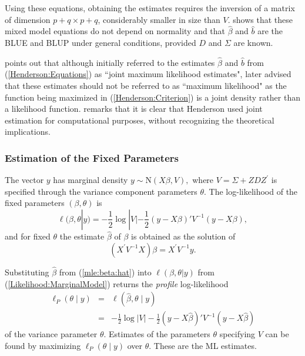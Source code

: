 \documentclass[12pt, a4paper]{report}
\theoremstyle{plain}
\theoremstyle{definition}
\theoremstyle{remark}
\begin{document}
		Using these equations, obtaining the estimates requires the inversion of a matrix
		of dimension $p+q \times p+q$, considerably smaller in size than $V$. \citet{Henderson63} shows that these mixed model equations do not depend on normality and that $\hat{\beta}$ and $\hat{b}$ are the BLUE and BLUP under general conditions, provided $D$ and $\Sigma$ are known.
		
		\cite{Robi:BLUP:1991} points out that although \cite{Henderson:1950} initially referred to the estimates $\hat{\beta}$ and $\hat{b}$ from (\ref{Henderson:Equations}) as ``joint maximum likelihood estimates", \cite{Henderson:1973} later advised that these estimates should not be referred to as ``maximum likelihood" as the function being maximized in (\ref{Henderson:Criterion}) is a joint density rather than a likelihood function. \cite{YLee} remarks that it is clear that Henderson used joint estimation for computational purposes, without recognizing the theoretical implications.
		
		
\subsubsection{Estimation of the Fixed Parameters}
			
			The vector $y$ has marginal density $y \sim \mathrm{N}(X \beta,V),$ where $V = \Sigma + ZDZ^\prime$ is specified through the variance component parameters $\theta.$ The log-likelihood of the fixed parameters $(\beta, \theta)$ is
			\begin{equation}
			\ell (\beta, \theta|y) =
			-\frac{1}{2} \log |V| -\frac{1}{2}(y -
			X \beta)'V^{-1}(y -
			X \beta), \label{Likelihood:MarginalModel}
			\end{equation}
			and for fixed $\theta$ the estimate $\hat{\beta}$ of $\beta$ is obtained as the solution of
			\begin{equation}
			(X^\prime V^{-1}X) {\beta} = X^\prime V^{-1}y.
			\label{mle:beta:hat}
			\end{equation}
			
Substituting $\hat{\beta}$ from (\ref{mle:beta:hat}) into $\ell(\beta, \theta|y)$ from (\ref{Likelihood:MarginalModel}) returns the \emph{profile} log-likelihood
			\begin{eqnarray*}
				\ell_P(\theta \mid y) &=& \ell(\hat{\beta}, \theta \mid y) \\
				&=& -\frac{1}{2} \log |V| -\frac{1}{2}(y - X \hat{\beta})'V^{-1}(y - X \hat{\beta})
			\end{eqnarray*}
			of the variance parameter $\theta.$ Estimates of the parameters $\theta$ specifying $V$ can be found by maximizing $\ell_P(\theta \mid y)$ over $\theta.$ These are the ML estimates.
			
\end{document}
